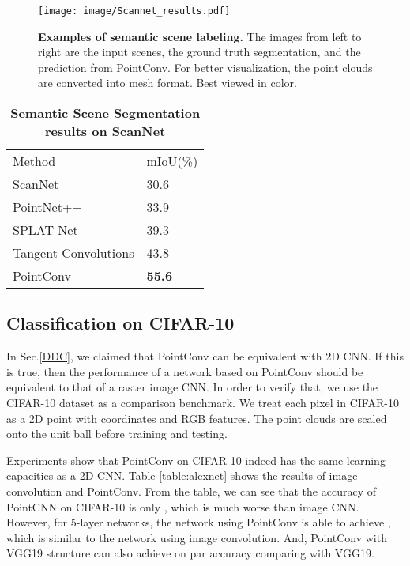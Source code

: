 \documentclass[10pt,twocolumn,letterpaper]{article}
\begin{document}
\begin{figure}
	\centering
	\texttt{[image: image/Scannet\_results.pdf]}
	\caption{\textbf{Examples of semantic scene labeling.} The images from left to right are the input scenes, the ground truth segmentation, and the prediction from PointConv. For better visualization, the point clouds are converted into mesh format. Best viewed in color.}
	\label{fig7}
\vspace{-0.05in}
\end{figure}

\setlength{\tabcolsep}{4pt}
\begin{table}
	\begin{center}
		\caption{\textbf{Semantic Scene Segmentation results on ScanNet}}
		\label{table2}
		\begin{tabular}{ll}
			\hline\noalign{\smallskip}
			Method & mIoU(\%)\\
			\noalign{\smallskip}
			\hline
			\noalign{\smallskip}
			ScanNet \cite{dai2017scannet} & 30.6 \\
			PointNet++ \cite{qi2017pointnet++} & 33.9\\
			SPLAT Net \cite{su2018splatnet} & 39.3\\
			Tangent Convolutions \cite{tatarchenko2018tangent} & 43.8\\
			\noalign{\smallskip}
			\hline
			\noalign{\smallskip}
			PointConv & \textbf{55.6}\\
			\hline
		\end{tabular}
	\end{center}
\vspace{-0.2in}
\end{table}
\setlength{\tabcolsep}{1.4pt}

\subsection{Classification on CIFAR-10}

In Sec.\ref{DDC}, we claimed that PointConv can be equivalent with 2D CNN. If this is true, then the performance of a network based on PointConv should be equivalent to that of a raster image CNN. In order to verify that, we use the CIFAR-10 dataset as a comparison benchmark. We treat each pixel in CIFAR-10 as a 2D point with  coordinates and RGB features. The point clouds are scaled onto the unit ball before training and testing.

Experiments show that PointConv on CIFAR-10 indeed has the same learning capacities as a 2D CNN. Table \ref{table:alexnet} shows the results of image convolution and PointConv. From the table, we can see that the accuracy of PointCNN\cite{li2018pointcnn} on CIFAR-10 is only , which is much worse than image CNN. However, for 5-layer networks, the network using PointConv is able to achieve , which is similar to the network using image convolution. And, PointConv with VGG19 \cite{simonyan2014very} structure can also achieve on par accuracy comparing with VGG19.
\end{document}
